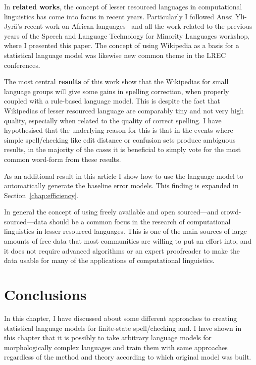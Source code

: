 \documentclass[officiallayout]{unihelcompling}
\begin{document}
In \textbf{related works}, the concept of lesser resourced languages in
computational linguistics has come into focus in recent years. Particularly I
followed Anssi Yli-Jyrä's recent work on African
languages~\citep{yli2005toward} and all the work related to the previous years
of the Speech and Language Technology for Minority Languages workshop, where I
presented this paper.  The concept of using Wikipedia as a basis for a
statistical language model was likewise new common theme in the LREC
conferences.

The most central \textbf{results} of this work show that the Wikipedias for
small language groups will give some gains in spelling correction, when
properly coupled with a rule-based language model. This is despite the fact
that Wikipedias of lesser resourced language are comparably tiny and not very
high quality, especially when related to the quality of correct spelling.  I
have hypothesised that the underlying reason for this is that in the events
where simple spell\-/checking like edit distance or confusion sets produce
ambiguous results, in the majority of the cases it is beneficial to simply vote
for the most common word-form from these results.

As an additional result in this article I show how to use the language model to
automatically generate the baseline error models. This finding is expanded in
Section~\ref{chap:efficiency}.

In general the concept of using freely available and open sourced---and
crowd-sourced---data should be a common focus in the research of computational
linguistics in lesser resourced languages. This is one of the main sources of
large amounts of free data that most communities are willing to put an effort
into, and it does not require advanced algorithms or an expert proofreader to
make the data usable for many of the applications of computational linguistics.

\section{Conclusions}

In this chapter, I have discussed about some different approaches to creating
statistical language models for finite-state spell\-/checking and. I have shown
in this chapter that it is possibly to take arbitrary language models for
morphologically complex languages and train them with same approaches
regardless of the method and theory according to which original model was
built.
\end{document}
